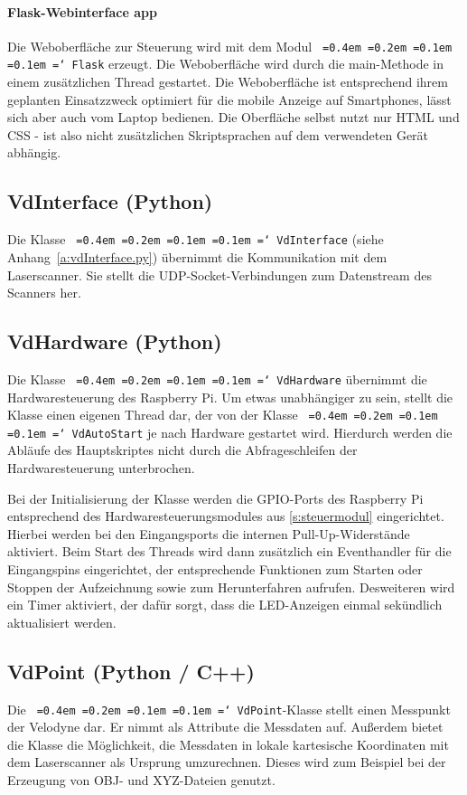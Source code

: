 \documentclass[a4paper,12pt,bibliography=totoc, listof=totoc,titlepage,pointlessnumbers]{scrreprt}
\newcommand*\justify{%
  \fontdimen2\font=0.4em%
  \fontdimen3\font=0.2em%
  \fontdimen4\font=0.1em%
  \fontdimen7\font=0.1em%
  \hyphenchar\font=`\-%
}
\newcommand{\code}[1]{\texttt{\justify{#1}}}
\begin{document}
\paragraph{Flask-Webinterface app}
Die Weboberfläche zur Steuerung wird mit dem Modul \code{Flask} erzeugt. Die Weboberfläche wird durch die main-Methode in einem zusätzlichen Thread gestartet.
Die Weboberfläche ist entsprechend ihrem geplanten Einsatzzweck optimiert für die mobile Anzeige auf Smartphones, lässt sich aber auch vom Laptop bedienen. Die Oberfläche selbst nutzt nur HTML und CSS - ist also nicht zusätzlichen Skriptsprachen auf dem verwendeten Gerät abhängig. 

\subsection{VdInterface (Python)}
Die Klasse \code{VdInterface} (siehe Anhang~\ref{a:vdInterface.py}) übernimmt die Kommunikation mit dem Laser\-scan\-ner. Sie stellt die UDP-Socket-Verbindungen zum Datenstream des Scanners her.


\subsection{VdHardware (Python)}
Die Klasse \code{VdHardware} übernimmt die Hardwaresteuerung des Raspberry Pi. Um etwas unabhängiger zu sein, stellt die Klasse einen eigenen Thread dar, der von der Klasse \code{VdAutoStart} je nach Hardware gestartet wird. Hierdurch werden die Abläufe des Hauptskriptes nicht durch die Abfrageschleifen der Hardwaresteuerung unterbrochen.

Bei der Initialisierung der Klasse werden die GPIO-Ports des Raspberry Pi entsprechend des Hardwaresteuerungsmodules aus \autoref{s:steuermodul} eingerichtet. Hierbei werden bei den Eingangsports die internen Pull-Up-Widerstände aktiviert. Beim Start des Threads wird dann zusätzlich ein Eventhandler für die Eingangspins eingerichtet, der entsprechende Funktionen zum Starten oder Stoppen der Aufzeichnung sowie zum Herunterfahren aufrufen. Desweiteren wird ein Timer aktiviert, der dafür sorgt, dass die LED-Anzeigen einmal sekündlich aktualisiert werden.

\subsection{VdPoint (Python / C++)}
Die \code{VdPoint}-Klasse stellt einen Messpunkt der Velodyne dar. Er nimmt als Attribute die Messdaten auf. Außerdem bietet die Klasse die Möglichkeit, die Messdaten in lokale kartesische Koordinaten mit dem Laserscanner als Ursprung umzurechnen. Dieses wird zum Beispiel bei der Erzeugung von OBJ- und XYZ-Dateien genutzt.
\end{document}
